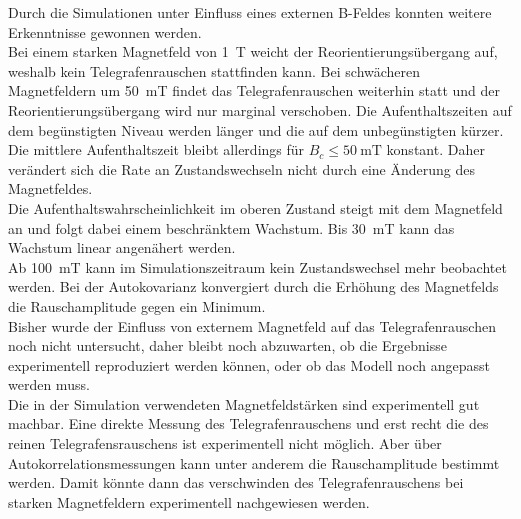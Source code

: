\documentclass[main.tex]{subfiles}
\begin{document}
Durch die Simulationen unter Einfluss eines externen B-Feldes konnten weitere Erkenntnisse gewonnen werden.\\
Bei einem starken Magnetfeld von \SI{1}{\tesla} weicht der Reorientierungsübergang auf, weshalb kein Telegrafenrauschen stattfinden kann. Bei schwächeren Magnetfeldern um \SI{50}{\milli\tesla} findet das Telegrafenrauschen weiterhin statt und der Reorientierungsübergang wird nur marginal verschoben. Die Aufenthaltszeiten auf dem begünstigten Niveau werden länger und die auf dem unbegünstigten kürzer. Die mittlere Aufenthaltszeit bleibt allerdings für \(B_c \leq \SI{50}{\milli\tesla}\) konstant. Daher verändert sich die Rate an Zustandswechseln nicht durch eine Änderung des Magnetfeldes.\\
Die Aufenthaltswahrscheinlichkeit im oberen Zustand steigt mit dem Magnetfeld an und folgt dabei einem beschränktem Wachstum. Bis \SI{30}{\milli\tesla} kann das Wachstum linear angenähert werden.\\ 
Ab \SI{100}{\milli\tesla} kann im Simulationszeitraum kein Zustandswechsel mehr beobachtet werden. Bei der Autokovarianz konvergiert durch die Erhöhung des Magnetfelds die Rauschamplitude gegen ein Minimum.\\



Bisher wurde der Einfluss von externem Magnetfeld auf das Telegrafenrauschen noch nicht untersucht, daher bleibt noch abzuwarten, ob die Ergebnisse experimentell reproduziert werden können, oder ob das Modell noch angepasst werden muss.\\
Die in der Simulation verwendeten Magnetfeldstärken sind experimentell gut machbar. Eine direkte Messung des Telegrafenrauschens und erst recht die des reinen Telegrafensrauschens ist experimentell nicht möglich. Aber über Autokorrelationsmessungen kann unter anderem die Rauschamplitude bestimmt werden. Damit könnte dann das verschwinden des Telegrafenrauschens bei starken Magnetfeldern experimentell nachgewiesen werden.\\
\end{document}
